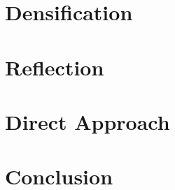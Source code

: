 \documentclass[11pt,a4paper,titlepage,oneside]{report}
\begin{document}
\chapter{Densification}

\chapter{Reflection}

\chapter{Direct Approach}

\chapter{Conclusion}

\listoffigures
 
\end{document}
